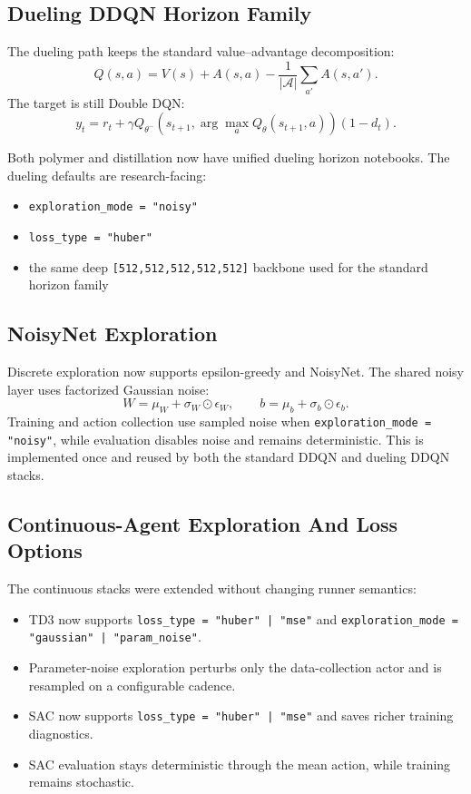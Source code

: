 \subsection{Dueling DDQN Horizon Family}
The dueling path keeps the standard value--advantage decomposition:
\[
Q(s,a) = V(s) + A(s,a) - \frac{1}{|\mathcal{A}|}\sum_{a'} A(s,a').
\]
The target is still Double DQN:
\[
y_t = r_t + \gamma Q_{\theta^-}\!\left(s_{t+1}, \arg\max_a Q_{\theta}(s_{t+1}, a)\right)(1-d_t).
\]

Both polymer and distillation now have unified dueling horizon notebooks. The dueling defaults are research-facing:
\begin{itemize}
  \item \texttt{exploration\_mode = "noisy"}
  \item \texttt{loss\_type = "huber"}
  \item the same deep \texttt{[512,512,512,512,512]} backbone used for the standard horizon family
\end{itemize}

\subsection{NoisyNet Exploration}
Discrete exploration now supports epsilon-greedy and NoisyNet. The shared noisy layer uses factorized Gaussian noise:
\[
W = \mu_W + \sigma_W \odot \epsilon_W,\qquad
b = \mu_b + \sigma_b \odot \epsilon_b.
\]
Training and action collection use sampled noise when \texttt{exploration\_mode = "noisy"}, while evaluation disables noise and remains deterministic. This is implemented once and reused by both the standard DDQN and dueling DDQN stacks.

\subsection{Continuous-Agent Exploration And Loss Options}
The continuous stacks were extended without changing runner semantics:
\begin{itemize}
  \item TD3 now supports \texttt{loss\_type = "huber" | "mse"} and \texttt{exploration\_mode = "gaussian" | "param\_noise"}.
  \item Parameter-noise exploration perturbs only the data-collection actor and is resampled on a configurable cadence.
  \item SAC now supports \texttt{loss\_type = "huber" | "mse"} and saves richer training diagnostics.
  \item SAC evaluation stays deterministic through the mean action, while training remains stochastic.
\end{itemize}

